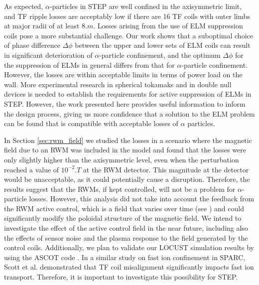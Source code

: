 \documentclass[10pt, a4paper, twoside]{article}
\begin{document}
As expected, $\alpha$-particles in STEP are well confined in the axisymmetric limit, and TF ripple losses are acceptably low if there are 16 TF coils with outer limbs at major radii of at least $\si{8.m}$. Losses arising from the use of ELM suppression coils pose a more substantial challenge. Our work shows that a suboptimal choice of phase difference $\Delta\phi$ between the upper and lower sets of ELM coils can result in significant deterioration of $\alpha$-particle confinement, and the optimum $\Delta\phi$ for the suppression of ELMs in general differs from that for $\alpha$-particle confinement. However, the losses are within acceptable limits in terms of power load on the wall. More experimental research in spherical tokamaks and in double null devices is needed to establish the requirements for active suppression of ELMs in STEP. However, the work presented here provides useful information to inform the design process, giving us more confidence that a solution to the ELM problem can be found that is compatible with acceptable losses of $\alpha$ particles.

In Section \ref{sec:rwm_field} we studied the losses in a scenario where the magnetic field due to an RWM was included in the model and found that the losses were only slightly higher than the axisymmetric level, even when the perturbation reached a value of $\si{10^{-2}.T}$ at the RWM detector. This magnitude at the detector would be unacceptable, as it could potentially cause a disruption. Therefore, the results suggest that the RWMs, if kept controlled, will not be a problem for $\alpha$-particle losses. However, this analysis did not take into account the feedback from the RWM active control, which is a field that varies over time (see \cite{xia2023}) and could significantly modify the poloidal structure of the magnetic field. We intend to investigate the effect of the active control field in the near future, including also the effects of sensor noise and the plasma response to the field generated by the control coils. Additionally, we plan to validate our LOCUST simulation results by using the ASCOT code \cite{hirvijoki2014}.
In a similar study on fast ion confinement in SPARC, Scott et al. \cite{Scott2020} demonstrated that TF coil misalignment significantly impacts fast ion transport. Therefore, it is important to investigate this possibility for STEP.

\end{document}

